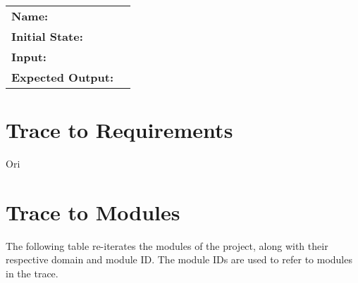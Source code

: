 \documentclass[12pt, titlepage]{article}
\begin{document}
\begin{center}
\begin{longtable}{ l | l }
\textbf{Name:} & \\
\textbf{Initial State:} & \\
\textbf{Input:} & \\
\textbf{Expected Output:} & \\
\hline

\end{longtable}

\end{center}
		
\section{Trace to Requirements}
	Ori

\section{Trace to Modules}

	The following table re-iterates the modules of the project, along with their respective domain and module ID. The module IDs are used to refer to modules in the trace.
\end{document}

